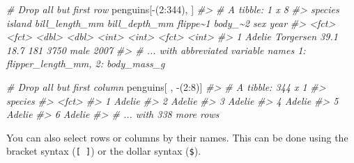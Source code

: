 \documentclass[
  12pt,
]{book}
\newenvironment{Shaded}{\begin{snugshade}}{\end{snugshade}}
\newcommand{\CommentTok}[1]{\textcolor[rgb]{0.56,0.35,0.01}{\textit{#1}}}
\newcommand{\DecValTok}[1]{\textcolor[rgb]{0.00,0.00,0.81}{#1}}
\newcommand{\NormalTok}[1]{#1}
\newcommand{\SpecialCharTok}[1]{\textcolor[rgb]{0.00,0.00,0.00}{#1}}
\begin{document}
\begin{Shaded}
\begin{Highlighting}[]
\CommentTok{\# Drop all but first row}
\NormalTok{penguins[}\SpecialCharTok{{-}}\NormalTok{(}\DecValTok{2}\SpecialCharTok{:}\DecValTok{344}\NormalTok{), ]}
\CommentTok{\#\textgreater{} \# A tibble: 1 x 8}
\CommentTok{\#\textgreater{}   species island    bill\_length\_mm bill\_depth\_mm flippe\textasciitilde{}1 body\_\textasciitilde{}2 sex    year}
\CommentTok{\#\textgreater{}   \textless{}fct\textgreater{}   \textless{}fct\textgreater{}              \textless{}dbl\textgreater{}         \textless{}dbl\textgreater{}    \textless{}int\textgreater{}   \textless{}int\textgreater{} \textless{}fct\textgreater{} \textless{}int\textgreater{}}
\CommentTok{\#\textgreater{} 1 Adelie  Torgersen           39.1          18.7      181    3750 male   2007}
\CommentTok{\#\textgreater{} \# ... with abbreviated variable names 1: flipper\_length\_mm, 2: body\_mass\_g}
\end{Highlighting}
\end{Shaded}

\begin{Shaded}
\begin{Highlighting}[]
\CommentTok{\# Drop all but first column }
\NormalTok{penguins[ , }\SpecialCharTok{{-}}\NormalTok{(}\DecValTok{2}\SpecialCharTok{:}\DecValTok{8}\NormalTok{)]}
\CommentTok{\#\textgreater{} \# A tibble: 344 x 1}
\CommentTok{\#\textgreater{}   species}
\CommentTok{\#\textgreater{}   \textless{}fct\textgreater{}  }
\CommentTok{\#\textgreater{} 1 Adelie }
\CommentTok{\#\textgreater{} 2 Adelie }
\CommentTok{\#\textgreater{} 3 Adelie }
\CommentTok{\#\textgreater{} 4 Adelie }
\CommentTok{\#\textgreater{} 5 Adelie }
\CommentTok{\#\textgreater{} 6 Adelie }
\CommentTok{\#\textgreater{} \# ... with 338 more rows}
\end{Highlighting}
\end{Shaded}

You can also select rows or columns by their names. This can be done using the bracket syntax (\texttt{{[}\ {]}}) or the dollar syntax (\texttt{\$}).
\end{document}
